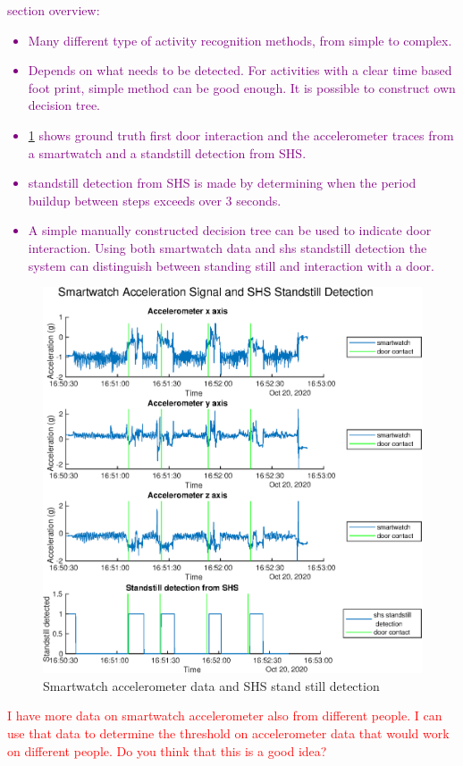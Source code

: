 \textcolor{purple}{ section overview:
\begin{itemize}
	\item Many different type of activity recognition methods, from simple to complex. 
	\item Depends on what needs to be detected. For activities with a clear time based foot print, simple method can be good enough. It is possible to construct own decision tree.
	\item \cref{fig:stand_still_detection_from_shs} shows ground truth first door interaction and the accelerometer traces from a smartwatch and a standstill detection from SHS.
	\item standstill detection from SHS is made by determining when the period buildup between steps exceeds over 3 seconds.
	\item A simple manually constructed decision tree can be used to indicate door interaction. Using both smartwatch data and shs standstill detection the system can distinguish between standing still and interaction with a door.  
\end{itemize}}

\begin{figure}[H]
	\centering
	\includegraphics[width=0.7\linewidth]{images/20201103_1325_Standstill_detection_from_SHS}
	\caption{Smartwatch accelerometer data and SHS stand still detection}
	\label{fig:stand_still_detection_from_shs}
\end{figure}

\textcolor{red}{I have more data on smartwatch accelerometer also from different people. I can use that data to determine the threshold on accelerometer data that would work on different people. Do you think that this is a good idea?}
